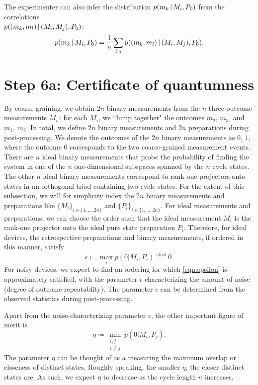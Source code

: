 The experimenter can also infer the distribution $p(m_k\thinspace\vert\thinspace M_i, P_0)$ from the correlations \\$p((m_k,m_l)\thinspace\vert\thinspace(M_i,M_j),P_0)$:
\begin{equation*}
p(m_k \thinspace\vert\thinspace M_i, P_0)=\frac{1}{n}\sum_{l,j}p((m_k,m_l)\thinspace\vert\thinspace (M_i,M_j),P_0).
\end{equation*}

\section{Step 6a: Certificate of quantumness}
\label{sec:certifyquant}
By coarse-graining, we obtain $2n$ binary measurements from the $n$ three-outcome measurements $M_i$\,: for each $M_i$, we ``lump together" the outcomes $m_2$, $m_3$, and $m_1$, $m_3$. In total, we define $2n$ binary measurements and $2n$ preparations during post-processing. We denote the outcomes of the $2n$ binary measurements as $0$, $1$, where the outcome $0$ corresponds to the two coarse-grained measurement events. There are $n$ ideal binary measurements that probe the probability of finding the system in one of the $n$ one-dimensional subspaces spanned by the $n$ cycle states. The other $n$ ideal binary measurements correspond to rank-one projectors onto states in an orthogonal triad containing two cycle states. For the extent of this subsection, we will for simplicity index the $2n$ binary measurements and preparations like $\{M_i\}_{i\in\{1,\dots,2n\}}$ and $\{P_i\}_{i\in\{1,\dots,2n\}}$. For ideal measurements and preparations, we can choose the order such that the ideal measurement $M_i$ is the rank-one projector onto the ideal pure state preparation $P_i$. Therefore, for ideal devices, the retrospective preparations and binary measurements, if ordered in this manner, satisfy \begin{equation}
\label{eqn:epsilon}
\epsilon \coloneqq \max_i p(0\vert M_i, P_i)\stackrel{\text{ideal}}{=}0.
\end{equation} 
For noisy devices, we expect to find an ordering for which \ref{eqn:epsilon} is approximately satisfied, with the parameter $\epsilon$ characterizing the amount of noise (degree of outcome-repeatablity). The parameter $\epsilon$ can be determined from the observed statistics during post-processing.

Apart from the noise-characterizing parameter $\epsilon$, the other important figure of merit is
\begin{equation*}
\eta\coloneqq \min_{\substack{i,j \\ i\neq j}} p(0\vert M_i, P_j).
\end{equation*}
The parameter $\eta$ can be thought of as a measuring the maximum overlap or closeness of distinct states. Roughly speaking, the smaller $\eta$, the closer distinct states are. As such, we expect $\eta$ to decrease as the cycle length $n$ increases. 

